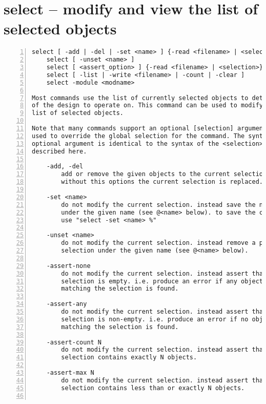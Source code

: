 \section{select -- modify and view the list of selected objects}
\label{cmd:select}
\begin{lstlisting}[numbers=left,frame=single]
    select [ -add | -del | -set <name> ] {-read <filename> | <selection>}
    select [ -unset <name> ]
    select [ <assert_option> ] {-read <filename> | <selection>}
    select [ -list | -write <filename> | -count | -clear ]
    select -module <modname>

Most commands use the list of currently selected objects to determine which part
of the design to operate on. This command can be used to modify and view this
list of selected objects.

Note that many commands support an optional [selection] argument that can be
used to override the global selection for the command. The syntax of this
optional argument is identical to the syntax of the <selection> argument
described here.

    -add, -del
        add or remove the given objects to the current selection.
        without this options the current selection is replaced.

    -set <name>
        do not modify the current selection. instead save the new selection
        under the given name (see @<name> below). to save the current selection,
        use "select -set <name> %"

    -unset <name>
        do not modify the current selection. instead remove a previously saved
        selection under the given name (see @<name> below).

    -assert-none
        do not modify the current selection. instead assert that the given
        selection is empty. i.e. produce an error if any object or module
        matching the selection is found.

    -assert-any
        do not modify the current selection. instead assert that the given
        selection is non-empty. i.e. produce an error if no object or module
        matching the selection is found.

    -assert-count N
        do not modify the current selection. instead assert that the given
        selection contains exactly N objects.

    -assert-max N
        do not modify the current selection. instead assert that the given
        selection contains less than or exactly N objects.


\end{lstlisting}

